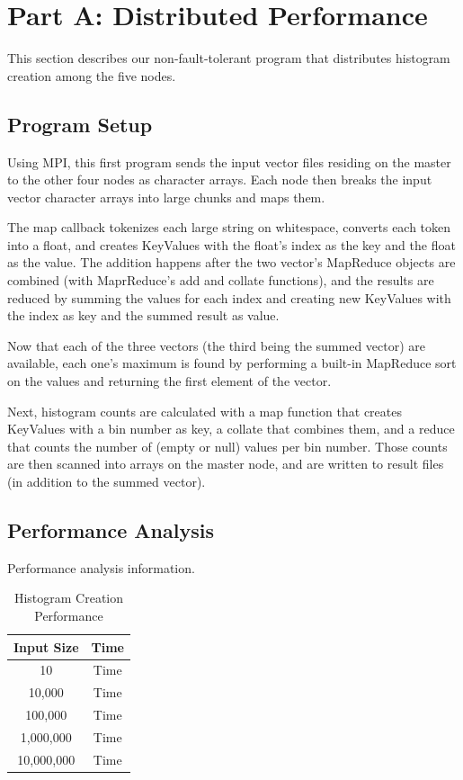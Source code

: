 \documentclass{acm_proc_article-sp}
\begin{document}
\section{Part A: Distributed Performance}
This section describes our non-fault-tolerant program that distributes histogram creation among the five nodes.

\subsection{Program Setup}
Using MPI, this first program sends the input vector files residing on the master to the other four nodes as character arrays. Each node then breaks the input vector character arrays into large chunks and maps them.

The map callback tokenizes each large string on whitespace, converts each token into a float, and creates KeyValues with the float's index as the key and the float as the value. The addition happens after the two vector's MapReduce objects are combined (with MaprReduce's add and collate functions), and the results are reduced by summing the values for each index and creating new KeyValues with the index as key and the summed result as value.

Now that each of the three vectors (the third being the summed vector) are available, each one's maximum is found by performing a built-in MapReduce sort on the values and returning the first element of the vector.

Next, histogram counts are calculated with a map function that creates KeyValues with a bin number as key, a collate that combines them, and a reduce that counts the number of (empty or null) values per bin number. Those counts are then scanned into arrays on the master node, and are written to result files (in addition to the summed vector).

\subsection{Performance Analysis}
Performance analysis information.

\begin{table}[tbp]
\centering
\caption{Histogram Creation Performance}
\label{PiTable}
\begin{tabular}{ c || c }
	Input Size & Time \\ \hline
    10 & Time \\
    10,000 & Time \\
    100,000 & Time \\
    1,000,000 & Time \\
    10,000,000 & Time \\
\end{tabular}
\end{table}
\end{document}
